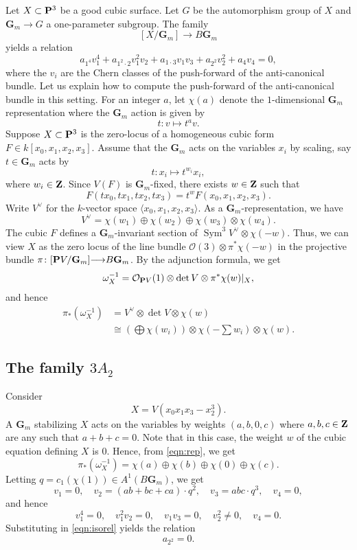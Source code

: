 \documentclass[reqno]{amsart}
\renewcommand{\to}{{\longrightarrow}}
\providecommand {\Z}{{\bf Z}}
\renewcommand {\P}{{\bf P}}
\providecommand{\Sym}{\operatorname{Sym}}
\numberwithin{equation}{section}
\renewcommand{\O}{\mathcal{O}}
\newcommand{\G}{\mathbf{G}}
\begin{document}
Let $X \subset \P^3$ be a good cubic surface.
Let $G$ be the automorphism group of $X$ and $\G_m \to G$ a one-parameter subgroup.
The family
\[ [X/\G_m] \to B\G_m\]
yields a relation
\begin{equation}\label{eqn:isorel}
  a_{1^4}v_1^4 + a_{1^2\cdot 2} v_1^2v_2 + a_{1\cdot 3} v_1v_3 + a_{2^2}v_2^2 + a_4 v_4 = 0,
\end{equation}
where the $v_i$ are the Chern classes of the push-forward of the anti-canonical bundle.
Let us explain how to compute the push-forward of the anti-canonical bundle in this setting.
For an integer $a$, let $\chi(a)$ denote the $1$-dimensional $\G_m$ representation where the $\G_m$ action is given by
\[ t \colon v \mapsto t^a v.\]
Suppose $X \subset \P^3$ is the zero-locus of a homogeneous cubic form $F \in k[x_0,x_1,x_2,x_3]$.
Assume that the $\G_m$ acts on the variables $x_i$ by scaling, say $t \in \G_m$ acts by
\[ t \colon x_i \mapsto t^{w_i}x_i,\]
where $w_i \in \Z$.
Since $V(F)$ is $\G_m$-fixed, there exists $w \in \Z$ such that
\[ F \left(t x_0, t x_1, t x_2, t x_3\right) = t^w F\left(x_0, x_1, x_2,x_3\right).\]
Write $V^{\vee}$ for the $k$-vector space $\langle x_0, x_1, x_2,x_3 \rangle$.
As a $\G_m$-representation, we have
\[ V^{\vee} = \chi(w_1) \oplus \chi(w_2) \oplus \chi(w_3) \otimes \chi(w_4).\]
The cubic $F$ defines a $\G_m$-invariant section of $\Sym^3 V^{\vee} \otimes \chi(-w)$.
Thus, we can view $X$ as the zero locus of the line bundle $\O(3) \otimes \pi^*\chi(-w)$ in the projective bundle $\pi \colon [\P V/\G_m] \to B\G_m$.
By the adjunction formula, we get
\[ \omega_X^{-1} = \O_{\P V}(1) \otimes \det V \otimes \pi^*\chi(w) |_X,\]
and hence
\begin{equation}\label{eqn:rep}
\begin{split}
  \pi_*\left( \omega_X^{-1} \right) &= V^{\vee} \otimes \det V \otimes \chi(w) \\
  &\cong \left( \bigoplus \chi(w_i)  \right) \otimes \chi\left(-\sum w_i\right) \otimes \chi(w).
\end{split}
\end{equation}

\subsection{The family $3A_2$}
Consider
\[ X = V(x_0x_1x_3 - x_2^3).\]
A $\G_m$ stabilizing $X$ acts on the variables by weights $(a,b,0,c)$ where $a,b,c \in \Z$ are any such that $a+b+c = 0$.
Note that in this case, the weight $w$ of the cubic equation defining $X$ is $0$.
Hence, from \eqref{eqn:rep}, we get
\[ \pi_*\left(\omega^{-1}_X\right) = \chi(a) \oplus \chi(b) \oplus \chi(0) \oplus \chi(c).\]
Letting $q = c_1(\chi(1)) \in A^1(B\G_m)$, we get
\[ v_1 = 0, \quad v_2 = (ab+bc+ca) \cdot q^2, \quad v_3 = abc \cdot q^3, \quad v_4 = 0,\]
and hence
\[ v_1^4 = 0, \quad v_1^2v_2 = 0, \quad v_1v_3 = 0,\quad v_2^2 \neq 0, \quad v_4 = 0.\]
Substituting in \eqref{eqn:isorel} yields the relation
\begin{equation}\label{eqn:iso1}
  a_{2^2} = 0.
\end{equation}
\end{document}
